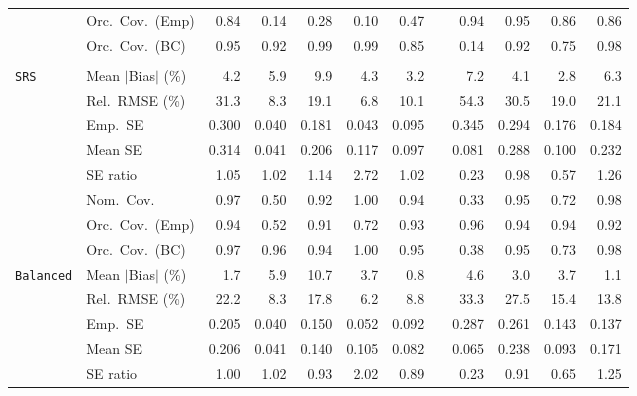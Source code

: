 \begin{landscape}
\begin{longtable}{llrrrrrrrrrr}
 & Orc.\ Cov.\ (Emp) & 0.84 & 0.14 & 0.28 & 0.10 & 0.47 &  & \cellcolor{ranktwo}0.94 & \cellcolor{rankone}0.95 & \cellcolor{rankthree}0.86 & 0.86 \\
 & Orc.\ Cov.\ (BC) & \cellcolor{rankone}0.95 & \cellcolor{rankthree}0.92 & 0.99 & 0.99 & 0.85 &  & 0.14 & \cellcolor{ranktwo}0.92 & 0.75 & 0.98 \\
\addlinespace[2pt]
\multicolumn{12}{l}{\textbf{Binary \& Categorical Phase-Two Covariates}} \\
\addlinespace[2pt]
\quad \texttt{SRS} & Mean $|$Bias$|$ (\%) & 4.2 & 5.9 & 9.9 & 4.3 & \cellcolor{ranktwo}3.2 &  & 7.2 & \cellcolor{rankthree}4.1 & \cellcolor{rankone}2.8 & 6.3 \\
 & Rel.\ RMSE (\%) & 31.3 & \cellcolor{ranktwo}8.3 & 19.1 & \cellcolor{rankone}6.8 & \cellcolor{rankthree}10.1 &  & 54.3 & 30.5 & 19.0 & 21.1 \\
 & Emp.\ SE & 0.300 & 0.040 & 0.181 & 0.043 & 0.095 &  & 0.345 & 0.294 & 0.176 & 0.184 \\
 & Mean SE & 0.314 & 0.041 & 0.206 & 0.117 & 0.097 &  & 0.081 & 0.288 & 0.100 & 0.232 \\
 & SE ratio & 1.05 & \cellcolor{rankthree}1.02 & 1.14 & 2.72 & \cellcolor{ranktwo}1.02 &  & 0.23 & \cellcolor{rankone}0.98 & 0.57 & 1.26 \\
 & Nom.\ Cov. & \cellcolor{rankthree}0.97 & 0.50 & 0.92 & 1.00 & \cellcolor{ranktwo}0.94 &  & 0.33 & \cellcolor{rankone}0.95 & 0.72 & 0.98 \\
 & Orc.\ Cov.\ (Emp) & \cellcolor{rankone}0.94 & 0.52 & 0.91 & 0.72 & 0.93 &  & \cellcolor{ranktwo}0.96 & \cellcolor{rankthree}0.94 & 0.94 & 0.92 \\
 & Orc.\ Cov.\ (BC) & 0.97 & 0.96 & \cellcolor{rankthree}0.94 & 1.00 & \cellcolor{ranktwo}0.95 &  & 0.38 & \cellcolor{rankone}0.95 & 0.73 & 0.98 \\
\addlinespace[2pt]
\quad \texttt{Balanced} & Mean $|$Bias$|$ (\%) & \cellcolor{rankthree}1.7 & 5.9 & 10.7 & 3.7 & \cellcolor{rankone}0.8 &  & 4.6 & 3.0 & 3.7 & \cellcolor{ranktwo}1.1 \\
 & Rel.\ RMSE (\%) & 22.2 & \cellcolor{ranktwo}8.3 & 17.8 & \cellcolor{rankone}6.2 & \cellcolor{rankthree}8.8 &  & 33.3 & 27.5 & 15.4 & 13.8 \\
 & Emp.\ SE & 0.205 & 0.040 & 0.150 & 0.052 & 0.092 &  & 0.287 & 0.261 & 0.143 & 0.137 \\
 & Mean SE & 0.206 & 0.041 & 0.140 & 0.105 & 0.082 &  & 0.065 & 0.238 & 0.093 & 0.171 \\
 & SE ratio & \cellcolor{rankone}1.00 & \cellcolor{ranktwo}1.02 & \cellcolor{rankthree}0.93 & 2.02 & 0.89 &  & 0.23 & 0.91 & 0.65 & 1.25 \\

\end{longtable}
\end{landscape}
